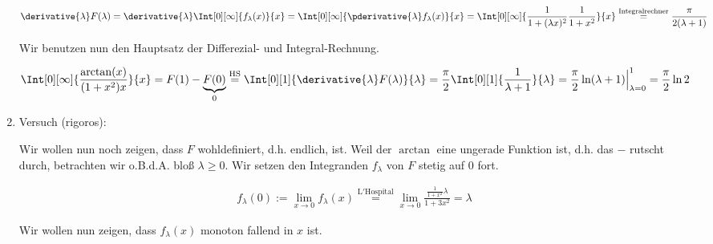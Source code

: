 \begin{solution}
\begin{enumerate}[label = \arabic*.]
    \begin{align*}
        \derivative{\lambda}
        F(\lambda)
        =
        \derivative{\lambda}
        \Int[0][\infty]{f_\lambda(x)}{x}
        =
        \Int[0][\infty]
        {
            \pderivative{\lambda}
            f_\lambda(x)
        }{x}
        =
        \Int[0][\infty]
        {
            \frac{1}
            {
                1 + (\lambda x)^2
            }    
            \frac{1}
            {
                1 + x^2
            }    
        }{x}
        \stackrel
        {
            \mathrm{Integralrechner}
        }{=}
        \frac{\pi}{2 (\lambda + 1)}
    \end{align*}

    Wir benutzen nun den Hauptsatz der Differezial- und Integral-Rechnung.

    \begin{align*}
        \Int[0][\infty]
        {
            \frac
            {
                \arctan(x)
            }{
                (1 + x^2) x
            }
        }{x}
        =
        F(1) - \underbrace{F(0)}_0
        \stackrel
        {
            \mathrm{HS}
        }{=}
        \Int[0][1]
        {
            \derivative{\lambda}
            F(\lambda)
        }{\lambda}
        =
        \frac{\pi}{2}
        \Int[0][1]
        {
            \frac{1}{\lambda + 1}
        }{\lambda}
        =
        \frac{\pi}{2}
        \ln(\lambda + 1) \Big |_{\lambda = 0}^1
        =
        \frac{\pi}{2}
        \ln 2
    \end{align*}

    \item Versuch (rigoros):
    
    Wir wollen nun noch zeigen, dass $F$ wohldefiniert, d.h. endlich, ist.
    Weil der $\arctan$ eine ungerade Funktion ist, d.h. das $-$ rutscht durch, betrachten wir o.B.d.A. bloß $\lambda \geq 0$.
    Wir setzen den Integranden $f_\lambda$ von $F$ stetig auf $0$ fort.

    \begin{align*}
        f_\lambda(0)
        :=
        \lim_{x \to 0}
        f_\lambda(x)
        \stackrel
        {
            \mathrm{L'Hospital}
        }{=}
        \lim_{x \to 0}
        \frac
        {
            \frac{1}{1 + x^2}
            \lambda
        }{
            1 + 3 x^2
        }
        =
        \lambda
    \end{align*}

    Wir wollen nun zeigen, dass $f_\lambda(x)$ monoton fallend in $x$ ist.


\end{enumerate}
\end{solution}
